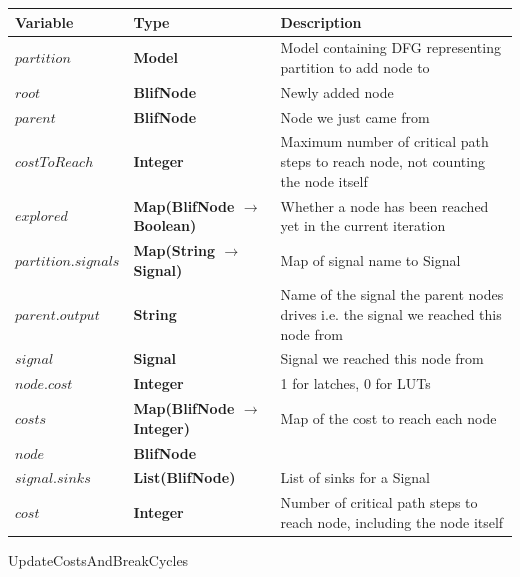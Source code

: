 \documentclass[12pt,final,oneside]{dwThesis} %
\begin{document}
   \begin{algorithm}

      \begin{center}

         \begin{tabularx}
            {\linewidth}{llX} \toprule
            Variable & Type & Description\\
            \midrule $partition$ &\textbf{Model } &  Model containing DFG representing partition to add
            node to\\
            $root$ &\textbf{BlifNode } &  Newly added node\\

            $parent$ &\textbf{BlifNode } &  Node we just came from\\

            $costToReach$ &\textbf{Integer } &  Maximum number of critical
            path steps to reach node, not counting the node itself \\

            $explored$ &\textbf{Map(BlifNode $\to$ Boolean) } &  Whether a
            node has been reached yet in the current iteration \\

            $partition.signals$ &\textbf{Map(String $\to$ Signal) } &  Map
            of signal name to Signal \\
            $parent.output$ &\textbf{String } &
            Name of the signal the parent nodes drives i.e. the signal we
            reached this node from\\
            $signal$ & \textbf{Signal } &  Signal we
            reached this node from\\
            $node.cost$ &\textbf{Integer } &  1 for
            latches, 0 for LUTs \\
            $costs$ &\textbf{Map(BlifNode $\to$
               Integer) } &  Map of the cost to reach each node \\
            $node$
            &\textbf{BlifNode } &  \\
            $signal.sinks$ &\textbf{List(BlifNode) } &  List of sinks for a Signal \\
            $cost$
            &\textbf{Integer } &  Number of critical path steps to reach node,
            including the node itself \\
            \bottomrule 
         \end{tabularx}


      \end{center}
      \caption{UpdateCostsAndBreakCycles}\label{updatecosts}


\end{algorithm}
\end{document}
